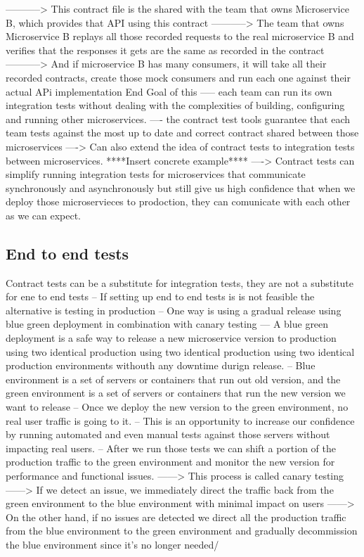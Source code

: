 \documentclass[a4paper, 11pt]{book}
\begin{document}
    -----------> This contract file is the shared with the team that owns Microservice B, which provides that API using this contract
    -----------> The team that owns Microservice B replays all those recorded requests to the real microservice B and verifies that the responses it gets are the same as recorded in the contract
    -----------> And if microservice B has many consumers, it will take all their recorded contracts, create those mock consumers and run each one against their actual APi implementation
    End Goal of this ----- each team can run its own integration tests without dealing with the complexities of building, configuring and running other microservices.
    ---- the contract test tools guarantee that each team tests against the most up to date and correct contract shared between those microservices
    ----> Can also extend the idea of contract tests to integration tests between microservices. ****Insert concrete example****
    ----> Contract tests can simplify running integration tests for microservices that communicate synchronously and asynchronously but still give us high confidence that when we deploy those microservieces to prodoction, they can comunicate with each other as we can expect.

    \subsection{End to end tests}
    Contract tests can be a substitute for integration tests, they are not a substitute for ene to end tests
    -- If setting up end to end tests is is not feasible the alternative is testing in production
    -- One way is using a gradual release using blue green deployment in combination with canary testing
    --- A blue green deployment is a safe way to release a new microservice version to production using two identical production using two identical production using two identical production environments withouth any downtime durign release.
    -- Blue environment is a set of servers or containers that run out old version, and the green environment is a set of servers or containers that run the new version we want to release
    -- Once we deploy the new version to the green environment, no real user traffic is going to it.
    -- This is an opportunity to increase our confidence by running automated and even manual tests against those servers without impacting real users.
    -- After we run those tests we can shift a portion of the production traffic to the green environment and monitor the new version for performance and functional issues.
    ------> This process is called canary testing
    ------> If we detect an issue, we immediately direct the traffic back from the green environment to the blue environment with minimal impact on users
    ------> On the other hand, if no issues are detected we direct all the production traffic from the blue environment to the green environment and gradually decommission the blue environment since it's no longer needed/
\end{document}

